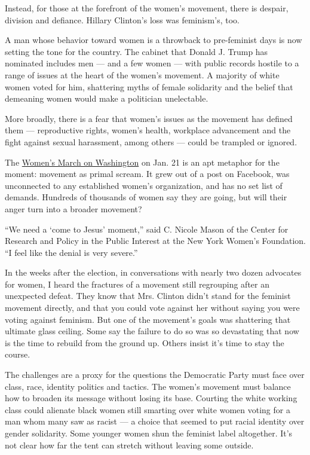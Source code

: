 Instead, for those at the forefront of the women's movement, there is
despair, division and defiance. Hillary Clinton's loss was feminism's,
too.

A man whose behavior toward women is a throwback to pre-feminist days is
now setting the tone for the country. The cabinet that Donald J. Trump
has nominated includes men --- and a few women --- with public records
hostile to a range of issues at the heart of the women's movement. A
majority of white women voted for him, shattering myths of female
solidarity and the belief that demeaning women would make a politician
unelectable.

More broadly, there is a fear that women's issues as the movement has
defined them --- reproductive rights, women's health, workplace
advancement and the fight against sexual harassment, among others ---
could be trampled or ignored.

The
\href{https://www.theguardian.com/us-news/2016/dec/27/womens-march-on-washington-dc-guide}{Women's
March on Washington} on Jan. 21 is an apt metaphor for the moment:
movement as primal scream. It grew out of a post on Facebook, was
unconnected to any established women's organization, and has no set list
of demands. Hundreds of thousands of women say they are going, but will
their anger turn into a broader movement?

``We need a `come to Jesus' moment,'' said C. Nicole Mason of the Center
for Research and Policy in the Public Interest at the New York Women's
Foundation. ``I feel like the denial is very severe.''

In the weeks after the election, in conversations with nearly two dozen
advocates for women, I heard the fractures of a movement still
regrouping after an unexpected defeat. They know that Mrs. Clinton
didn't stand for the feminist movement directly, and that you could vote
against her without saying you were voting against feminism. But one of
the movement's goals was shattering that ultimate glass ceiling. Some
say the failure to do so was so devastating that now is the time to
rebuild from the ground up. Others insist it's time to stay the course.

The challenges are a proxy for the questions the Democratic Party must
face over class, race, identity politics and tactics. The women's
movement must balance how to broaden its message without losing its
base. Courting the white working class could alienate black women still
smarting over white women voting for a man whom many saw as racist --- a
choice that seemed to put racial identity over gender solidarity. Some
younger women shun the feminist label altogether. It's not clear how far
the tent can stretch without leaving some outside.

